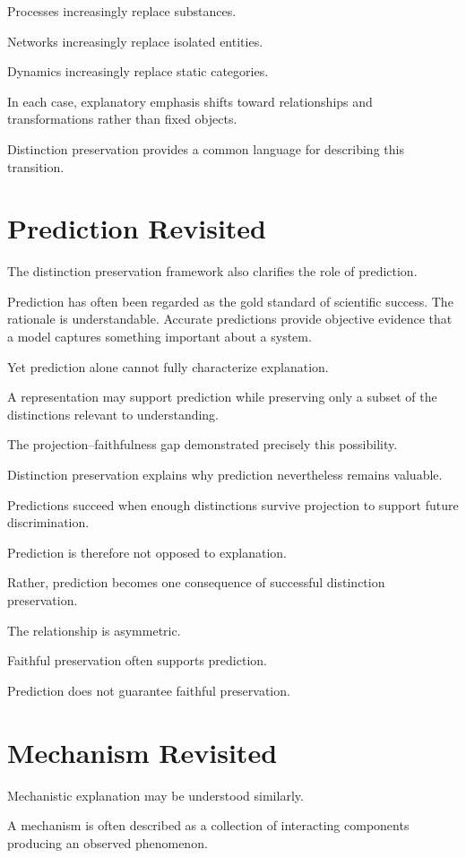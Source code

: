\documentclass[11pt,oneside,openany]{book}
\begin{document}
Processes increasingly replace substances.

Networks increasingly replace isolated entities.

Dynamics increasingly replace static categories.

In each case, explanatory emphasis shifts toward relationships and transformations rather than fixed objects.

Distinction preservation provides a common language for describing this transition.

\section{Prediction Revisited}

The distinction preservation framework also clarifies the role of prediction.

Prediction has often been regarded as the gold standard of scientific success. The rationale is understandable. Accurate predictions provide objective evidence that a model captures something important about a system.

Yet prediction alone cannot fully characterize explanation.

A representation may support prediction while preserving only a subset of the distinctions relevant to understanding.

The projection--faithfulness gap demonstrated precisely this possibility.

Distinction preservation explains why prediction nevertheless remains valuable.

Predictions succeed when enough distinctions survive projection to support future discrimination.

Prediction is therefore not opposed to explanation.

Rather, prediction becomes one consequence of successful distinction preservation.

The relationship is asymmetric.

Faithful preservation often supports prediction.

Prediction does not guarantee faithful preservation.

\section{Mechanism Revisited}

Mechanistic explanation may be understood similarly.

A mechanism is often described as a collection of interacting components producing an observed phenomenon.
\end{document}
